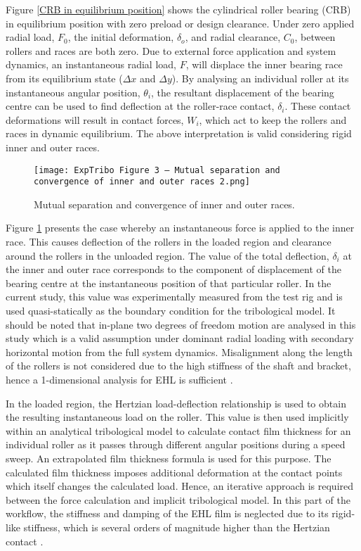 Figure \ref{CRB in equilibrium position} shows the cylindrical roller bearing (CRB) in equilibrium position with zero preload or design clearance. Under zero applied radial load, $F_0$, the initial deformation, $\delta_o$, and radial clearance, $C_0$, between rollers and races are both zero. Due to external force application and system dynamics, an instantaneous radial load, $F$, will displace the inner bearing race from its equilibrium state ($\Delta x$ and $\Delta y$). By analysing an individual roller at its instantaneous angular position, $\theta_i$, the resultant displacement of the bearing centre can be used to find deflection at the roller-race contact, $\delta_i$. These contact deformations will result in contact forces, $W_i$, which act to keep the rollers and races in dynamic equilibrium. The above interpretation is valid considering rigid inner and outer races.

\begin{figure}
	\centering
	\texttt{[image: ExpTribo Figure 3 – Mutual separation and convergence of inner and outer races 2.png]}
	\caption{Mutual separation and convergence of inner and outer races.}
	\label{Mutual separation and convergence of inner and outer races}
\end{figure}

Figure \ref{Mutual separation and convergence of inner and outer races} presents the case whereby an instantaneous force is applied to the inner race. This causes deflection of the rollers in the loaded region and clearance around the rollers in the unloaded region. The value of the total deflection, $\delta_i$ at the inner and outer race corresponds to the component of displacement of the bearing centre at the instantaneous position of that particular roller. In the current study, this value was experimentally measured from the test rig and is used quasi-statically as the boundary condition for the tribological model. It should be noted that in-plane two degrees of freedom motion are analysed in this study which is a valid assumption under dominant radial loading with secondary horizontal motion from the full system dynamics. Misalignment along the length of the rollers is not considered due to the high stiffness of the shaft and bracket, hence a 1-dimensional analysis for EHL is sufficient \cite{Gupta1979}.

In the loaded region, the Hertzian load-deflection relationship is used to obtain the resulting instantaneous load on the roller. This value is then used implicitly within an analytical tribological model to calculate contact film thickness for an individual roller as it passes through different angular positions during a speed sweep. An extrapolated film thickness formula is used for this purpose. The calculated film thickness imposes additional deformation at the contact points which itself changes the calculated load. Hence, an iterative approach is required between the force calculation and implicit tribological model. In this part of the workflow, the stiffness and damping of the EHL film is neglected due to its rigid-like stiffness, which is several orders of magnitude higher than the Hertzian contact \cite{Walford1983} \cite{Dareing1975} \cite{Mehdigoli1990}.

